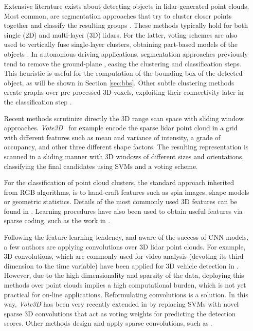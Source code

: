 \documentclass[letterpaper, 10 pt, conference]{ieeeconf}  %
\begin{document}
 
Extensive literature exists about detecting objects in lidar-generated point clouds. Most common, are segmentation approaches that try to cluster closer points together and classify the resulting groups \cite{arras2007using, vaquero2016low, douillard2011segmentation, mertz2013moving}. These methods typically hold for both single (2D) and multi-layer (3D) lidars. For the latter, voting schemes are also used to vertically fuse single-layer clusters, obtaining part-based models of the objects \cite{mozos2010multi, spinello2010layered}. 
In autonomous driving applications, segmentation approaches previously tend to remove the ground-plane \cite{petrovskaya2009model, teichman2011towards}, easing the clustering and classification steps. This heuristic is useful for the computation of the bounding box of the detected object, as will be shown in Section \ref{sec:bbs}.
Other subtle clustering methods create graphs over pre-processed 3D voxels, exploiting their connectivity later in the classification step \cite{wang2012could, triebel2010segmentation, papon2013voxel}.

Recent methods scrutinize directly the 3D range scan space with sliding window approaches. 
\textit{Vote3D}~\cite{wang2015voting} for example encode the sparse lidar point cloud in a grid with different features such as mean and variance of intensity, a grade of occupancy, and other three different shape factors. The resulting representation is scanned in a sliding manner with 3D windows of different sizes and orientations, classifying the final candidates using SVMs and a voting scheme. 

For the classification of point cloud clusters, the standard approach inherited from RGB algorithms, is to hand-craft features such as spin images, shape models or geometric statistics. Details of the most commonly used 3D features can be found in \cite{behley2012performance}. 
Learning procedures have also been used to obtain useful features via sparse coding, such as the work in \cite{de2013unsupervised}. 

Following the feature learning tendency, and aware of the success of CNN models, a few authors are applying convolutions over 3D lidar point clouds. 
For example, 3D convolutions, which are commonly used for video analysis (devoting its third dimension to the time variable) have been applied for 3D vehicle detection in \cite{li20163d}. However, due to the high dimensionality and sparsity of the data, deploying this methods over point clouds implies a high computational burden, which is not yet practical for on-line applications.
Reformulating convolutions is a solution. In this way, \textit{Vote3D} has been very recently extended in \cite{engelcke2017vote3deep} by replacing SVMs with novel sparse 3D convolutions that act as voting weights for predicting the detection scores. Other methods design and apply sparse convolutions, such as \cite{jampani2016learning, graham2015sparse}.
\end{document}
